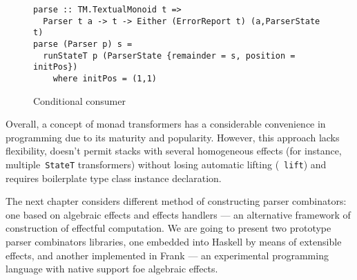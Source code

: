       \begin{figure}[h]
      \begin{lstlisting}
parse :: TM.TextualMonoid t =>
  Parser t a -> t -> Either (ErrorReport t) (a,ParserState t)
parse (Parser p) s =
  runStateT p (ParserState {remainder = s, position = initPos})
    where initPos = (1,1)
      \end{lstlisting}
      \caption{Conditional consumer}
      \label{listing:mtlParserSta}
      \end{figure}

      Overall, a concept of monad transformers has a considerable convenience in programming due to
      its maturity and popularity. However, this
      approach lacks flexibility, doesn't permit stacks with several homogeneous
      effects (for instance, multiple~\texttt{StateT} transformers) without
      losing automatic lifting (~\texttt{lift}) and requires boilerplate
      type class instance declaration.

      The next chapter considers different method of constructing parser combinators: one
      based on algebraic effects and effects handlers --- an alternative framework of construction of effectful computation. We are going to present two prototype
      parser combinators libraries, one embedded into Haskell by means of extensible
      effects, and another implemented in Frank --- an experimental programming language
      with native support foe algebraic effects.